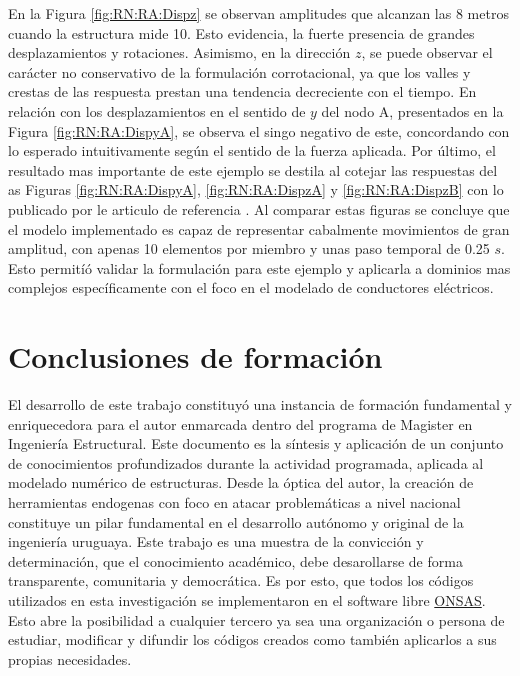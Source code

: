  En la Figura \ref{fig:RN:RA:Dispz} se observan amplitudes que alcanzan las 8 metros cuando la estructura mide 10. Esto evidencia, la fuerte presencia de grandes desplazamientos y rotaciones. Asimismo, en la dirección $z$, se puede observar el carácter no conservativo de la formulación corrotacional, ya que los valles y crestas de las respuesta prestan una tendencia decreciente con el tiempo. En relación con los desplazamientos en el sentido de $y$ del nodo A, presentados en la Figura \ref{fig:RN:RA:DispyA}, se observa el singo negativo de este, concordando con lo esperado intuitivamente según el sentido de la fuerza aplicada. Por último, el resultado mas importante de este ejemplo se destila al cotejar las respuestas del as Figuras \ref{fig:RN:RA:DispyA}, \ref{fig:RN:RA:DispzA} y \ref{fig:RN:RA:DispzB} con lo publicado por le articulo de referencia \citep{Le2014}. Al comparar estas figuras se concluye que el modelo implementado es capaz de representar cabalmente movimientos de gran amplitud, con apenas 10 elementos por miembro y unas paso temporal de 0.25 $s$. Esto permitíó validar la formulación para este ejemplo y aplicarla a dominios mas complejos específicamente con el foco en el modelado de conductores eléctricos. 









\section{Conclusiones de formación}
El desarrollo de este trabajo constituyó una instancia de formación fundamental y enriquecedora para el autor enmarcada dentro del programa de Magister en Ingeniería Estructural. Este documento es la síntesis y aplicación de un conjunto de conocimientos profundizados durante la actividad programada, aplicada al modelado numérico de estructuras. Desde la óptica del autor, la creación de herramientas endogenas con foco en atacar problemáticas a nivel nacional constituye un pilar fundamental en el desarrollo autónomo y original de la ingeniería uruguaya. Este trabajo es una muestra de la convicción y determinación, que el conocimiento académico, debe desarollarse de forma transparente, comunitaria y democrática. Es por esto, que todos los códigos utilizados en esta investigación se implementaron en el software libre \href{https://github.com/ONSAS/ONSAS/}{ONSAS}. Esto abre la posibilidad a cualquier tercero ya sea una organización o persona de estudiar, modificar y difundir los códigos creados como también aplicarlos a sus propias necesidades. 

